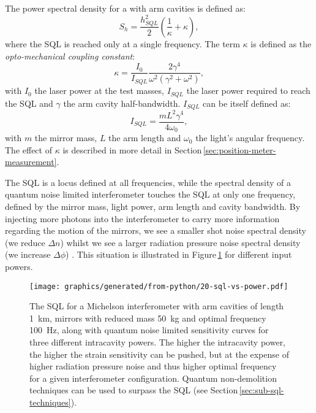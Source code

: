 The power spectral density for a \MI{} with arm cavities is defined as:
\begin{equation}
  \label{eq:classicalifospectrum}
  S_h = \frac{h^{2}_{SQL}}{2} \left( \frac{1}{\kappa} + \kappa \right),
\end{equation}
where the \gls{SQL} is reached only at a single frequency. The term $\kappa$ is defined as the \emph{opto-mechanical coupling constant}:
\begin{equation}
 \kappa = \frac{I_0}{I_{SQL}} \frac{2 \gamma^4}{\omega^2 \left( \gamma^2 +
\omega^2 \right)},
 \label{eq:optomechanicalcoupling}
\end{equation}
with $I_0$ the laser power at the test masses, $I_{SQL}$ the laser power required to reach the \gls{SQL} and $\gamma$ the arm cavity half-bandwidth. $I_{SQL}$ can be itself defined as:
\begin{equation}
 I_{SQL} = \frac{m L^2 \gamma^4}{4 \omega_0},
\end{equation}
with $m$ the mirror mass, $L$ the arm length and $\omega_0$ the light's angular frequency. The effect of $\kappa$ is described in more detail in Section\,\ref{sec:position-meter-measurement}.

The \gls{SQL} is a locus defined at all frequencies, while the spectral density of a quantum noise limited interferometer touches the \gls{SQL} at only one frequency, defined by the mirror mass, light power, arm length and cavity bandwidth. By injecting more photons into the interferometer to carry more information regarding the motion of the mirrors, we see a smaller shot noise spectral density (we reduce $\Delta n$) whilst we see a larger radiation pressure noise spectral density (we increase $\Delta \phi$) \cite{Caves1981}. This situation is illustrated in Figure\,\ref{fig:sql-vs-input-power} for different input powers.

\begin{figure}
  \centering
  \texttt{[image: graphics/generated/from-python/20-sql-vs-power.pdf]}
  \caption[Standard quantum limit and the quantum noise with various input powers]{\label{fig:sql-vs-input-power}The \gls{SQL} for a Michelson interferometer with arm cavities of length \SI{1}{\kilo\meter}, mirrors with reduced mass \SI{50}{\kilo\gram} and optimal frequency \SI{100}{\hertz}, along with quantum noise limited sensitivity curves for three different intracavity powers. The higher the intracavity power, the higher the strain sensitivity can be pushed, but at the expense of higher radiation pressure noise and thus higher optimal frequency for a given interferometer configuration. Quantum non-demolition techniques can be used to surpass the \gls{SQL} (see Section\,\ref{sec:sub-sql-techniques}).}
\end{figure}

